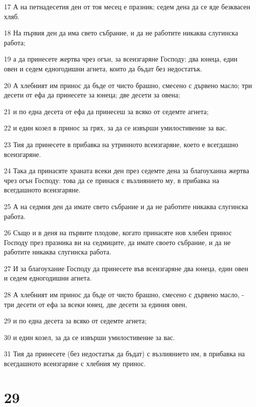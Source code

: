 \par 17 А на петнадесетия ден от тоя месец е празник; седем дена да се яде безквасен хляб.
\par 18 На първия ден да има свето събрание, и да не работите никаква слугинска работа;
\par 19 а да принесете жертва чрез огън, за всеизгаряне Господу: два юнеца, един овен и седем едногодишни агнета, които да бъдат без недостатък.
\par 20 А хлебният им принос да бъде от чисто брашно, смесено с дървено масло; три десети от ефа да принесете за юнеца; две десети за овена;
\par 21 и по една десета от ефа да принесеш за всяко от седемте агнета;
\par 22 и един козел в принос за грях, за да се извърши умилостивение за вас.
\par 23 Тия да принесете в прибавка на утринното всеизгаряне, което е всегдашно всеизгаряне.
\par 24 Така да принасяте храната всеки ден през седемте дена за благоуханна жертва чрез огън Господу: това да се принася с възлиянието му, в прибавка на всегдашното всеизгаряне.
\par 25 А на седмия ден да имате свето събрание и да не работите никаква слугинска работа.
\par 26 Също и в деня на първите плодове, когато принасяте нов хлебен принос Господу през празника ви на седмиците, да имате своето събрание, и да не работите никаква слугинска работа.
\par 27 И за благоухание Господу да принесете във всеизгаряне два юнеца, един овен и седем едногодишни агнета.
\par 28 А хлебният им принос да бъде от чисто брашно, смесено с дървено масло, - три десети от ефа за всеки юнец, две десети за единия овен,
\par 29 и по една десета за всяко от седемте агнета;
\par 30 и един козел, за да се извърши умилостивение за вас.
\par 31 Тия да принесете (без недостатък да бъдат) с възлиянието им, в прибавка на всегдашното всеизгаряне с хлебния му принос.

\chapter{29}

